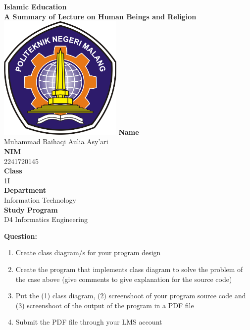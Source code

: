 \documentclass[12pt,titlepage]{article}
\newcommand{\vSubject}{Islamic Education}
\newcommand{\vSubtitle}{A Summary of Lecture on}
\newcommand{\vSubsubtitle}{Human Beings and Religion}
\newcommand{\vName}{Muhammad Baihaqi Aulia Asy'ari}
\newcommand{\vNIM}{2241720145}
\newcommand{\vClass}{1I}
\newcommand{\vDepartment}{Information Technology}
\newcommand{\vStudyProgram}{D4 Informatics Engineering}
\begin{document}
\begin{titlepage}
    \centering
    \vfill
    {\bfseries\LARGE
        \vSubject\\
        \vskip0.25cm
        \vSubtitle
        \vskip0.25cm
        \vSubsubtitle
    }
    \vfill
    \includegraphics[width=6cm]{images/polinema-logo.png}
    \vfill
    {
        \textbf{Name}\\
        \vName\\
        \vskip0.5cm
        \textbf{NIM}\\
        \vNIM\\
        \vskip0.5cm
        \textbf{Class}\\
        \vClass\\
        \vskip0.5cm
        \textbf{Department}\\
        \vDepartment\\
        \vskip0.5cm
        \textbf{Study Program}\\
        \vStudyProgram
    }
\end{titlepage}

\newpage

\textbf{Question: }

\begin{enumerate}
    \item Create class diagram/s for your program design
    \item Create the program that implements class diagram to solve the
    problem of the case above (give comments to give explanation for the
    source code)
    \item Put the (1) class diagram, (2) screenshoot of your program source
    code and (3) screenshoot of the output of the program in a PDF file
    \item Submit the PDF file through your LMS account
\end{enumerate}
\end{document}
